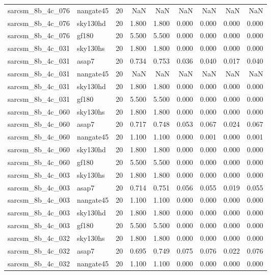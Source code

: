 \begin{tabular}{llrrrrrrr}
sarcsm\_8b\_4c\_076 & nangate45 & 20 & NaN & NaN & NaN & NaN & NaN & NaN \\
sarcsm\_8b\_4c\_076 & sky130hd & 20 & 1.800 & 1.800 & 0.000 & 0.000 & 0.000 & 0.000 \\
sarcsm\_8b\_4c\_076 & gf180 & 20 & 5.500 & 5.500 & 0.000 & 0.000 & 0.000 & 0.000 \\
sarcsm\_8b\_4c\_031 & sky130hs & 20 & 1.800 & 1.800 & 0.000 & 0.000 & 0.000 & 0.000 \\
sarcsm\_8b\_4c\_031 & asap7 & 20 & 0.734 & 0.753 & 0.036 & 0.040 & 0.017 & 0.040 \\
sarcsm\_8b\_4c\_031 & nangate45 & 20 & NaN & NaN & NaN & NaN & NaN & NaN \\
sarcsm\_8b\_4c\_031 & sky130hd & 20 & 1.800 & 1.800 & 0.000 & 0.000 & 0.000 & 0.000 \\
sarcsm\_8b\_4c\_031 & gf180 & 20 & 5.500 & 5.500 & 0.000 & 0.000 & 0.000 & 0.000 \\
sarcsm\_8b\_4c\_060 & sky130hs & 20 & 1.800 & 1.800 & 0.000 & 0.000 & 0.000 & 0.000 \\
sarcsm\_8b\_4c\_060 & asap7 & 20 & 0.717 & 0.748 & 0.053 & 0.067 & 0.024 & 0.067 \\
sarcsm\_8b\_4c\_060 & nangate45 & 20 & 1.100 & 1.100 & 0.000 & 0.001 & 0.000 & 0.001 \\
sarcsm\_8b\_4c\_060 & sky130hd & 20 & 1.800 & 1.800 & 0.000 & 0.000 & 0.000 & 0.000 \\
sarcsm\_8b\_4c\_060 & gf180 & 20 & 5.500 & 5.500 & 0.000 & 0.000 & 0.000 & 0.000 \\
sarcsm\_8b\_4c\_003 & sky130hs & 20 & 1.800 & 1.800 & 0.000 & 0.000 & 0.000 & 0.000 \\
sarcsm\_8b\_4c\_003 & asap7 & 20 & 0.714 & 0.751 & 0.056 & 0.055 & 0.019 & 0.055 \\
sarcsm\_8b\_4c\_003 & nangate45 & 20 & 1.100 & 1.100 & 0.000 & 0.000 & 0.000 & 0.000 \\
sarcsm\_8b\_4c\_003 & sky130hd & 20 & 1.800 & 1.800 & 0.000 & 0.000 & 0.000 & 0.000 \\
sarcsm\_8b\_4c\_003 & gf180 & 20 & 5.500 & 5.500 & 0.000 & 0.000 & 0.000 & 0.000 \\
sarcsm\_8b\_4c\_032 & sky130hs & 20 & 1.800 & 1.800 & 0.000 & 0.000 & 0.000 & 0.000 \\
sarcsm\_8b\_4c\_032 & asap7 & 20 & 0.695 & 0.749 & 0.075 & 0.076 & 0.022 & 0.076 \\
sarcsm\_8b\_4c\_032 & nangate45 & 20 & 1.100 & 1.100 & 0.000 & 0.000 & 0.000 & 0.000 \\

\end{tabular}
